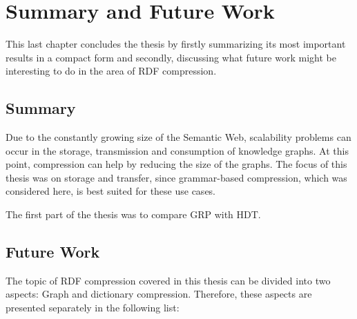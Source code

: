 \chapter{Summary and Future Work}\label{ch:summary_and_discussion}

This last chapter concludes the thesis by firstly summarizing its most important results in a compact form and secondly,  discussing what future work might be interesting to do in the area of RDF compression.

\section{Summary}

Due to the constantly growing size of the Semantic Web, scalability problems can occur in the storage, transmission and consumption of knowledge graphs. At this point, compression can help by reducing the size of the graphs. The focus of this thesis was on storage and transfer, since grammar-based compression, which was considered here, is best suited for these use cases. 

The first part of the thesis was to compare GRP with HDT. 

\section{Future Work}

The topic of RDF compression covered in this thesis can be divided into two aspects: Graph and dictionary compression. Therefore, these aspects are presented separately in the following list:

